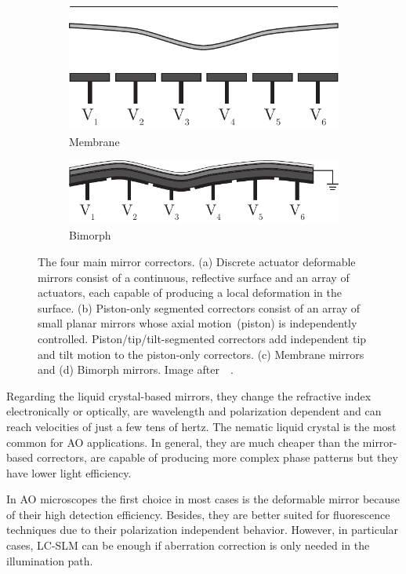 \begin{figure}[tbh]
			\begin{subfigure}[b]{0.25\textwidth}
							\includegraphics[width=\textwidth]{images/deformable_membrane}
							\caption{Membrane}
							\label{fig:Correctors_membrane}
			\end{subfigure}
			\quad
			\begin{subfigure}[b]{0.25\textwidth}
							\includegraphics[width=\textwidth]{images/deformable_bimorph}
							\caption{Bimorph}
							\label{fig:Correctors_bimorph}
			\end{subfigure}							
			\caption{The four main mirror correctors. (a) Discrete actuator deformable mirrors consist of a continuous, reflective surface and an array of actuators, each capable of producing a local deformation in the surface. (b) Piston-only segmented correctors consist of an array of small planar mirrors whose axial motion~(piston) is independently controlled. Piston/tip/tilt-segmented correctors add independent tip and tilt motion to the piston-only correctors. (c) Membrane mirrors and (d) Bimorph mirrors. Image after~~\cite{AO_vision_science}.}
	\label{fig:Correctors}
\end{figure} 


Regarding the liquid crystal-based mirrors, they change the refractive index electronically or optically, are wavelength and polarization dependent and can reach velocities of just a few tens of hertz. The nematic liquid crystal is the most common for AO applications. In general, they are much cheaper than the mirror-based correctors, are capable of producing more complex phase patterns but they have lower light efficiency.   

In AO microscopes the first choice in most cases is the deformable mirror because of their high detection efficiency. Besides, they are better suited for fluorescence techniques due to their polarization independent behavior. However, in particular cases, LC-SLM can be enough if aberration correction is only needed in the illumination path.

